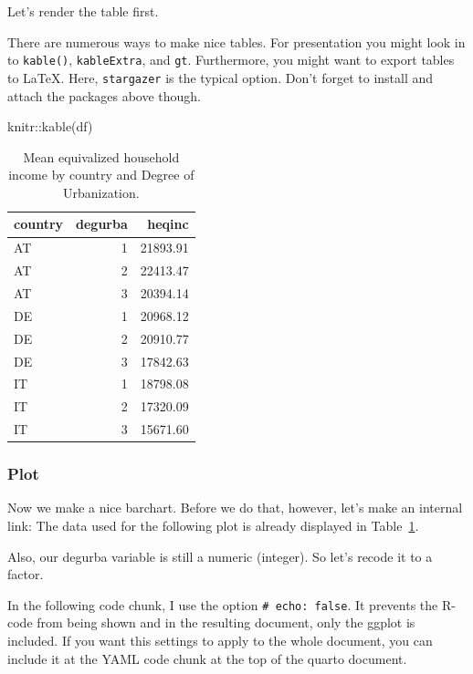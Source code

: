 \documentclass[
  letterpaper,
  DIV=11,
  numbers=noendperiod]{scrartcl}
\newenvironment{Shaded}{\begin{snugshade}}{\end{snugshade}}
\newcommand{\FunctionTok}[1]{\textcolor[rgb]{0.28,0.35,0.67}{#1}}
\newcommand{\NormalTok}[1]{\textcolor[rgb]{0.00,0.23,0.31}{#1}}
\newcommand{\SpecialCharTok}[1]{\textcolor[rgb]{0.37,0.37,0.37}{#1}}
\begin{document}
Let's render the table first.

There are numerous ways to make nice tables. For presentation you might
look in to \texttt{kable()}, \texttt{kableExtra}, and \texttt{gt}.
Furthermore, you might want to export tables to LaTeX. Here,
\texttt{stargazer} is the typical option. Don't forget to install and
attach the packages above though.

\begin{Shaded}
\begin{Highlighting}[]
\NormalTok{knitr}\SpecialCharTok{::}\FunctionTok{kable}\NormalTok{(df)}
\end{Highlighting}
\end{Shaded}

\begin{longtable}[]{@{}lrr@{}}

\caption{\label{tbl-degurba-heqinc}Mean equivalized household income by
country and Degree of Urbanization.}

\tabularnewline

\toprule\noalign{}
country & degurba & heqinc \\
\midrule\noalign{}
\endhead
\bottomrule\noalign{}
\endlastfoot
AT & 1 & 21893.91 \\
AT & 2 & 22413.47 \\
AT & 3 & 20394.14 \\
DE & 1 & 20968.12 \\
DE & 2 & 20910.77 \\
DE & 3 & 17842.63 \\
IT & 1 & 18798.08 \\
IT & 2 & 17320.09 \\
IT & 3 & 15671.60 \\

\end{longtable}

\subsubsection{Plot}\label{plot}

Now we make a nice barchart. Before we do that, however, let's make an
internal link: The data used for the following plot is already displayed
in Table~\ref{tbl-degurba-heqinc}.

Also, our degurba variable is still a numeric (integer). So let's recode
it to a factor.

In the following code chunk, I use the option
\texttt{\#\textbar{}\ echo:\ false}. It prevents the R-code from being
shown and in the resulting document, only the ggplot is included. If you
want this settings to apply to the whole document, you can include it at
the YAML code chunk at the top of the quarto document.
\end{document}
